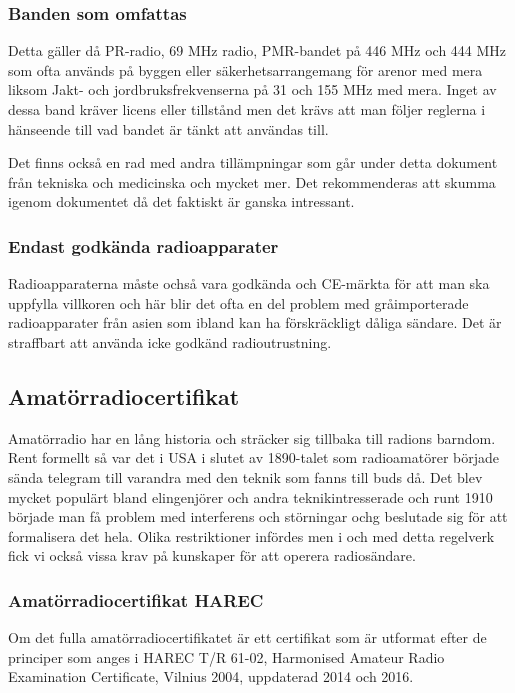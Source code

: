 \subsubsection{Banden som omfattas}

Detta gäller då PR-radio, 69 MHz radio, PMR-bandet på 446 MHz och 444 MHz som
ofta används på byggen eller säkerhetsarrangemang för arenor med mera liksom
Jakt- och jordbruksfrekvenserna på 31 och 155 MHz med mera. Inget av dessa band
kräver licens eller tillstånd men det krävs att man följer reglerna i hänseende
till vad bandet är tänkt att användas till.

Det finns också en rad med andra tillämpningar som går under detta dokument från
tekniska och medicinska och mycket mer. Det rekommenderas att skumma igenom
dokumentet då det faktiskt är ganska intressant.

\subsubsection{Endast godkända radioapparater}

Radioapparaterna måste ochså vara godkända och CE-märkta för att man ska
uppfylla villkoren och här blir det ofta en del problem med gråimporterade
radioapparater från asien som ibland kan ha förskräckligt dåliga sändare. Det är
straffbart att använda icke godkänd radioutrustning.

\subsection{Amatörradiocertifikat}

Amatörradio har en lång historia och sträcker sig tillbaka till radions
barndom. Rent formellt så var det i USA i slutet av 1890-talet som radioamatörer
började sända telegram till varandra med den teknik som fanns till buds då. Det
blev mycket populärt bland elingenjörer och andra teknikintresserade och runt
1910 började man få problem med interferens och störningar ochg beslutade sig
för att formalisera det hela. Olika restriktioner infördes men i och med detta
regelverk fick vi också vissa krav på kunskaper för att operera radiosändare.

\subsubsection{Amatörradiocertifikat HAREC}

Om det fulla amatörradiocertifikatet är ett certifikat som är utformat efter de
principer som anges i HAREC T/R 61-02, Harmonised Amateur Radio Examination
Certificate, Vilnius 2004, uppdaterad 2014 och 2016.

